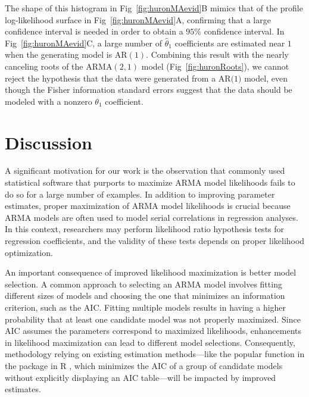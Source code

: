 The shape of this histogram in Fig~\ref{fig:huronMAevid}B mimics that of the profile log-likelihood surface in Fig~\ref{fig:huronMAevid}A, confirming that a large confidence interval is needed in order to obtain a $95\%$ confidence interval.
In Fig~\ref{fig:huronMAevid}C, a large number of $\hat{\theta}_1$ coefficients are estimated near $1$ when the generating model is $\text{AR}(1)$.
Combining this result with the nearly canceling roots of the $\text{ARMA}(2, 1)$ model (Fig~\ref{fig:huronRoots}), we cannot reject the hypothesis that the data were generated from a $\text{AR(1)}$ model, even though the Fisher information standard errors suggest that the data should be modeled with a nonzero $\theta_1$ coefficient.

\section{Discussion}

\noindent A significant motivation for our work is the observation that commonly used statistical software that purports to maximize ARMA model likelihoods fails to do so for a large number of examples.
In addition to improving parameter estimates, proper maximization of ARMA model likelihoods is crucial because ARMA models are often used to model serial correlations in regression analyses.
In this context, researchers may perform likelihood ratio hypothesis tests for regression coefficients, and the validity of these tests depends on proper likelihood optimization.

An important consequence of improved likelihood maximization is better model selection.
A common approach to selecting an ARMA model involves fitting different sizes of models and choosing the one that minimizes an information criterion, such as the AIC.
Fitting multiple models results in having a higher probability that at least one candidate model was not properly maximized.
Since AIC assumes the parameters correspond to maximized likelihoods, enhancements in likelihood maximization can lead to different model selections.
Consequently, methodology relying on existing estimation methods---like the popular  function in the  package in R \cite{hyndman08}, which minimizes the AIC of a group of candidate models without explicitly displaying an AIC table---will be impacted by improved estimates.

